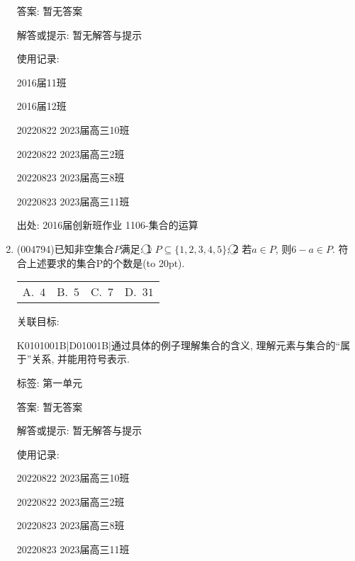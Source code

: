 \documentclass[10pt,a4paper]{article}
\newcommand{\bracket}[1]{(\hbox to #1pt{})}
\newcommand{\fourch}[4]{\par\begin{tabular}{p{.23\textwidth}p{.23\textwidth}p{.23\textwidth}p{.23\textwidth}}
A.~#1 &B.~#2& C.~#3& D.~#4
\end{tabular}}
\begin{document}
\begin{enumerate}[1.]
答案: 暂无答案

解答或提示: 暂无解答与提示

使用记录:

2016届11班	

2016届12班	

20220822	2023届高三10班	

20220822	2023届高三2班	

20220823	2023届高三8班	

20220823	2023届高三11班	


出处: 2016届创新班作业	1106-集合的运算
\item { (004794)}已知非空集合$P$满足: \textcircled{1} $P\subseteq \{1,2,3,4,5\}$; \textcircled{2} 若$a\in P$, 则$6-a\in P$. 符合上述要求的集合P的个数是\bracket{20}.
\fourch{$4$}{$5$}{$7$}{$31$}


关联目标:

K0101001B|D01001B|通过具体的例子理解集合的含义, 理解元素与集合的``属于''关系, 并能用符号表示.



标签: 第一单元

答案: 暂无答案

解答或提示: 暂无解答与提示

使用记录:

20220822	2023届高三10班	

20220822	2023届高三2班	

20220823	2023届高三8班	

20220823	2023届高三11班	



\end{enumerate}
\end{document}
